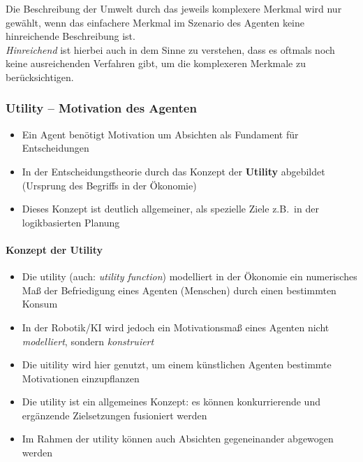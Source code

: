 Die Beschreibung der Umwelt durch das jeweils komplexere Merkmal wird nur gewählt, wenn das einfachere Merkmal im Szenario des Agenten keine hinreichende Beschreibung ist.\\
\textit{Hinreichend} ist hierbei auch in dem Sinne zu verstehen, dass es oftmals noch keine ausreichenden Verfahren gibt, um die komplexeren Merkmale zu berücksichtigen.

\subsubsection{Utility -- Motivation des Agenten}
\begin{itemize}
	\item Ein Agent benötigt Motivation um Absichten als Fundament für Entscheidungen
	\item In der Entscheidungstheorie durch das Konzept der \textbf{Utility} abgebildet (Ursprung des Begriffs in der Ökonomie)
	\item Dieses Konzept ist deutlich allgemeiner, als spezielle Ziele z.B.\ in der logikbasierten Planung	
\end{itemize}

\paragraph{Konzept der Utility}
\begin{itemize}
	\item Die utility (auch: \textit{utility function}) modelliert in der Ökonomie ein numerisches Maß der Befriedigung eines Agenten (Menschen) durch einen bestimmten Konsum
	\item In der Robotik/KI wird jedoch ein Motivationsmaß eines Agenten nicht \emph{modelliert}, sondern \emph{konstruiert}
	\item Die uitility wird hier genutzt, um einem künstlichen Agenten bestimmte Motivationen einzupflanzen
	\item Die utility ist ein allgemeines Konzept: es können konkurrierende und ergänzende Zielsetzungen fusioniert werden
	\item Im Rahmen der utility können auch Absichten gegeneinander abgewogen werden
\end{itemize}

